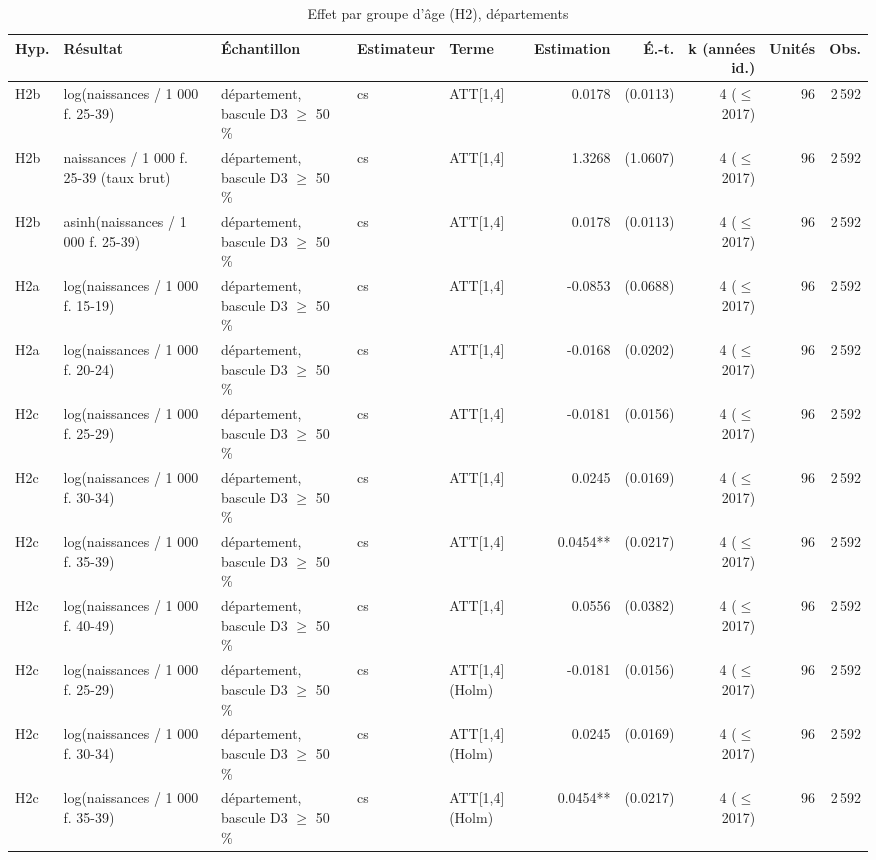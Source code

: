 \begin{table}\centering
\begin{threeparttable}
\caption{Effet par groupe d'âge (H2), départements}\label{tab:h2age}
\scriptsize
\begin{tabular}{lp{4.0cm}p{5.1cm}lp{3.5cm}rrrrr}
\toprule
Hyp. & Résultat & Échantillon & Estimateur & Terme & Estimation & É.-t. & k (années id.) & Unités & Obs. \\
\midrule
H2b & log(naissances / 1 000 f. 25-39) & département, bascule D3 $\geq$ 50 \% & cs & ATT[1,4] & 0.0178 & (0.0113) & 4 ($\leq$ 2017) & 96 & 2\,592 \\
H2b & naissances / 1 000 f. 25-39 (taux brut) & département, bascule D3 $\geq$ 50 \% & cs & ATT[1,4] & 1.3268 & (1.0607) & 4 ($\leq$ 2017) & 96 & 2\,592 \\
H2b & asinh(naissances / 1 000 f. 25-39) & département, bascule D3 $\geq$ 50 \% & cs & ATT[1,4] & 0.0178 & (0.0113) & 4 ($\leq$ 2017) & 96 & 2\,592 \\
H2a & log(naissances / 1 000 f. 15-19) & département, bascule D3 $\geq$ 50 \% & cs & ATT[1,4] & -0.0853 & (0.0688) & 4 ($\leq$ 2017) & 96 & 2\,592 \\
H2a & log(naissances / 1 000 f. 20-24) & département, bascule D3 $\geq$ 50 \% & cs & ATT[1,4] & -0.0168 & (0.0202) & 4 ($\leq$ 2017) & 96 & 2\,592 \\
H2c & log(naissances / 1 000 f. 25-29) & département, bascule D3 $\geq$ 50 \% & cs & ATT[1,4] & -0.0181 & (0.0156) & 4 ($\leq$ 2017) & 96 & 2\,592 \\
H2c & log(naissances / 1 000 f. 30-34) & département, bascule D3 $\geq$ 50 \% & cs & ATT[1,4] & 0.0245 & (0.0169) & 4 ($\leq$ 2017) & 96 & 2\,592 \\
H2c & log(naissances / 1 000 f. 35-39) & département, bascule D3 $\geq$ 50 \% & cs & ATT[1,4] & 0.0454** & (0.0217) & 4 ($\leq$ 2017) & 96 & 2\,592 \\
H2c & log(naissances / 1 000 f. 40-49) & département, bascule D3 $\geq$ 50 \% & cs & ATT[1,4] & 0.0556 & (0.0382) & 4 ($\leq$ 2017) & 96 & 2\,592 \\
H2c & log(naissances / 1 000 f. 25-29) & département, bascule D3 $\geq$ 50 \% & cs & ATT[1,4] (Holm) & -0.0181 & (0.0156) & 4 ($\leq$ 2017) & 96 & 2\,592 \\
H2c & log(naissances / 1 000 f. 30-34) & département, bascule D3 $\geq$ 50 \% & cs & ATT[1,4] (Holm) & 0.0245 & (0.0169) & 4 ($\leq$ 2017) & 96 & 2\,592 \\
H2c & log(naissances / 1 000 f. 35-39) & département, bascule D3 $\geq$ 50 \% & cs & ATT[1,4] (Holm) & 0.0454** & (0.0217) & 4 ($\leq$ 2017) & 96 & 2\,592 \\

\end{tabular}
\end{threeparttable}
\end{table}
